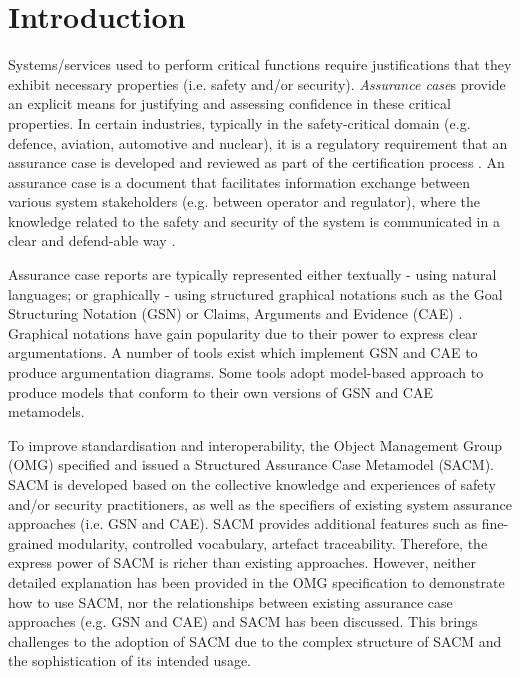 \section{Introduction}
Systems/services used to perform critical functions require justifications that they exhibit necessary properties (i.e. safety and/or security). 
\textit{Assurance case}s provide an explicit means for justifying and assessing confidence in these critical properties. 
In certain industries, typically in the safety-critical domain (e.g. defence, aviation, automotive and nuclear), it is a regulatory requirement that an assurance case is developed and reviewed as part of the certification process \cite{healthFound}.
An assurance case is a document that facilitates information exchange between various system stakeholders (e.g. between operator and regulator), where the knowledge related to the safety and security of the system is communicated in a clear and defend-able way \cite{hawkins2013assurance}. 

Assurance case reports are typically represented either textually - using natural languages; or graphically - using structured graphical notations such as the Goal Structuring Notation (GSN) \cite{kelly2004goal} or Claims, Arguments and Evidence (CAE) \cite{cae}. 
Graphical notations have gain popularity due to their power to express clear argumentations.
A number of tools exist which implement GSN and CAE to produce argumentation diagrams. 
Some tools adopt model-based approach to produce models that conform to their own versions of GSN and CAE metamodels. 


To improve standardisation and interoperability, the Object Management Group (OMG) specified and issued a Structured Assurance Case Metamodel (SACM). 
SACM is developed based on the collective knowledge and experiences of safety and/or security practitioners, as well as the specifiers of existing system assurance approaches (i.e. GSN and CAE). 
SACM provides additional features such as fine-grained modularity, controlled vocabulary, artefact traceability. 
Therefore, the express power of SACM is richer than existing approaches. 
However, neither detailed explanation has been provided in the OMG specification to demonstrate how to use SACM, nor the relationships between existing assurance case approaches (e.g. GSN and CAE) and SACM has been discussed. 
This brings challenges to the adoption of SACM due to the complex structure of SACM and the sophistication of its intended usage. 

